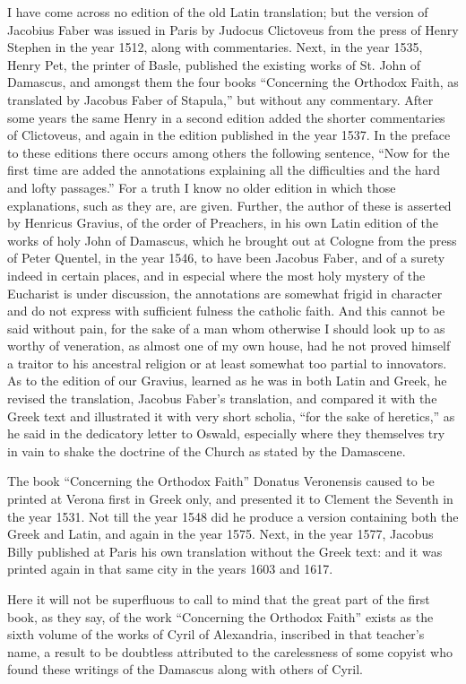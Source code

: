 I have come across no edition of the old Latin translation; but the version of Jacobius Faber was issued in Paris by Judocus Clictoveus from the press of Henry Stephen in the year 1512, along with commentaries. Next, in the year 1535, Henry Pet, the printer of Basle, published the existing works of St. John of Damascus, and amongst them the four books “Concerning the Orthodox Faith, as translated by Jacobus Faber of Stapula,” but without any commentary. After some years the same Henry in a second edition added the shorter commentaries of Clictoveus, and again in the edition published in the year 1537. In the preface to these editions there occurs among others the following sentence, “Now for the first time are added the annotations explaining all the difficulties and the hard and lofty passages.” For a truth I know no older edition in which those explanations, such as they are, are given. Further, the author of these is asserted by Henricus Gravius, of the order of Preachers, in his own Latin edition of the works of holy John of Damascus, which he brought out at Cologne from the press of Peter Quentel, in the year 1546, to have been Jacobus Faber, and of a surety indeed in certain places, and in especial where the most holy mystery of the Eucharist is under discussion, the annotations are somewhat frigid in character and do not express with sufficient fulness the catholic faith. And this cannot be said without pain, for the sake of a man whom otherwise I should look up to as worthy of veneration, as almost one of my own house, had he not proved himself a traitor to his ancestral religion or at least somewhat too partial to innovators. As to the edition of our Gravius, learned as he was in both Latin and Greek, he revised the translation, Jacobus Faber’s translation, and compared it with the Greek text and illustrated it with very short scholia, “for the sake of heretics,” as he said in the dedicatory letter to Oswald, especially where they themselves try in vain to shake the doctrine of the Church as stated by the Damascene.

The book “Concerning the Orthodox Faith” Donatus Veronensis caused to be printed at Verona first in Greek only, and presented it to Clement the Seventh in the year 1531. Not till the year 1548 did he produce a version containing both the Greek and Latin, and again in the year 1575. Next, in the year 1577, Jacobus Billy published at Paris his own translation without the Greek text: and it was printed again in that same city in the years 1603 and 1617.

Here it will not be superfluous to call to mind that the great part of the first book, as they say, of the work “Concerning the Orthodox Faith” exists as the sixth volume of the works of Cyril of Alexandria, inscribed in that teacher’s name, a result to be doubtless attributed to the carelessness of some copyist who found these writings of the Damascus along with others of Cyril.

